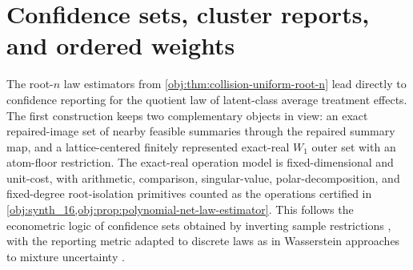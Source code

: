 \documentclass[11pt]{article}
\begin{document}
\section{Confidence sets, cluster reports, and ordered weights}

The root-\(n\) law estimators from \cref{obj:thm:collision-uniform-root-n} lead directly to confidence reporting for the quotient law of latent-class average treatment effects. The first construction keeps two complementary objects in view: an exact repaired-image set of nearby feasible summaries through the repaired summary map, and a lattice-centered finitely represented exact-real \(W_1\) outer set with an atom-floor restriction. The exact-real operation model is fixed-dimensional and unit-cost, with arithmetic, comparison, singular-value, polar-decomposition, and fixed-degree root-isolation primitives counted as the operations certified in \cref{obj:synth_16,obj:prop:polynomial-net-law-estimator}. This follows the econometric logic of confidence sets obtained by inverting sample restrictions \citep{RobinsVanDerVaart2006}, with the reporting metric adapted to discrete laws as in Wasserstein approaches to mixture uncertainty \citep{DeoRandrianarisoa2023}.
\end{document}
